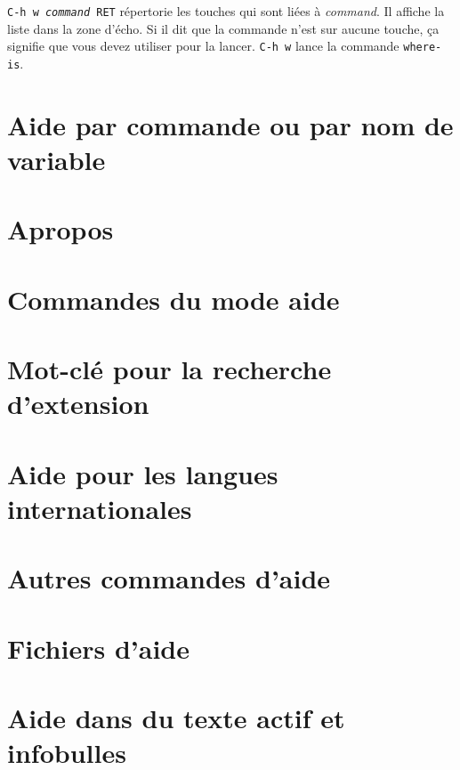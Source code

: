 \texttt{C-h w \textit{command} RET} répertorie les touches qui sont
liées à \textit{command}. Il affiche la liste dans la zone d'écho. Si
il dit que la commande n'est sur aucune touche, ça signifie que vous
devez utiliser  pour la lancer. \texttt{C-h w}  lance la
commande \texttt{where-is}.
\section{Aide par commande ou par nom de variable}
\section{Apropos}
\section{Commandes du mode aide}
\section{Mot-clé pour la recherche d'extension}
\section{Aide pour les langues internationales}
\section{Autres commandes d'aide}
\section{Fichiers d'aide}
\section{Aide dans du texte actif et infobulles}
